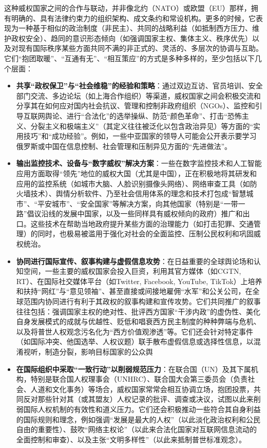 \documentclass[UTF8, 10pt]{ctexbook}
\begin{document}
这种威权国家之间的合作与联动，并非像北约（NATO）或欧盟（EU）那样，拥有明确的、具有法律约束力的组织架构、成文条约和常设机构。更多的时候，它表现为一种基于相似的政治制度（非民主）、共同的战略利益（如抵制西方压力、维护政权安全）、趋同的意识形态倾向（如强调国家主权、集体主义、秩序优先）以及对现有国际秩序某些方面共同不满的非正式的、灵活的、多层次的协调与互助。它们“抱团取暖”、“互通有无”、“相互策应”的方式是多种多样的，至少包括以下几个层面：
\begin{itemize}
    \item \textbf{共享“政权保卫”与“社会维稳”的经验和策略}：通过双边互访、官员培训、安全部门交流、多边论坛（如上海合作组织）等渠道，威权国家之间会积极交流和分享其在如何应对国内社会抗议、管理和控制非政府组织（NGOs）、监控和引导互联网舆论、进行“合法化”的选举操纵、防范“颜色革命”、打击“恐怖主义、分裂主义和极端主义”（其定义往往被泛化以包含政治异见）等方面的“实用技巧”和“成功经验”。例如，一些中亚国家的领导人可能会公开表示要学习俄罗斯或中国在信息控制、社会管理和压制异见方面的“先进做法”。
    \item \textbf{输出监控技术、设备与“数字威权”解决方案}：一些在数字监控技术和人工智能应用方面取得“领先”地位的威权大国（尤其是中国），正在积极地将其研发和应用的监控系统（如城市大脑、人脸识别摄像头网络）、网络审查工具（如防火墙技术）、舆情分析软件、乃至社会信用体系的理念和技术打包成“智慧城市”、“平安城市”、“安全国家”等解决方案，向其他国家（特别是“一带一路”倡议沿线的发展中国家，以及一些同样具有威权倾向的政府）推广和出口。这些技术在帮助当地政府提升某些方面的治理能力（如打击犯罪、交通管理）的同时，也极易被滥用于强化对社会的全面监控、压制公民权利和巩固威权统治。
    \item \textbf{协同进行国际宣传、叙事构建与虚假信息攻势}：在日益重要的全球舆论场和认知空间，一些主要的威权国家会投入巨资，利用其官方媒体（如CGTN, RT）、在国际社交媒体平台（如Twitter, Facebook, YouTube, TikTok）上培养和扶持“网红”与“意见领袖”、甚至直接或间接地雇佣“水军”和公关公司，在全球范围内协同进行有利于其政权的叙事构建和宣传攻势。它们共同推广的叙事往往包括：强调国家主权的绝对性、批评西方国家“干涉内政”的虚伪性、美化自身发展模式的成就与优越性、贬低和唱衰西方民主制度的种种弊端与危机、以及将普世人权观念污名化为“西方价值观渗透”等。它们还会针对特定事件（如国际冲突、他国选举、人权议题）联手散布虚假信息或选择性信息，以混淆视听，制造分裂，影响目标国家的公众舆
    \item \textbf{在国际组织中采取“一致行动”以削弱规范压力}：在联合国（UN）及其下属机构，特别是联合国人权理事会（UNHRC）、联合国大会第三委员会（负责社会、人道和文化事务）等场合，威权国家常常会相互协调立场，抱团投票，共同反对那些针对其（或其盟友）人权记录的批评、调查或决议，试图以此来削弱国际人权机制的有效性和道义压力。它们还会积极推动一些符合其自身利益的国际规则和理念，例如强调“发展是最大的人权”（以此淡化政治权利和公民自由的重要性）、鼓吹“网络主权论”（以此来合法化国家对互联网信息流动的全面控制和审查）、以及主张“文明多样性”（以此来抵制普世标准观念）。

\end{itemize}
\end{document}
